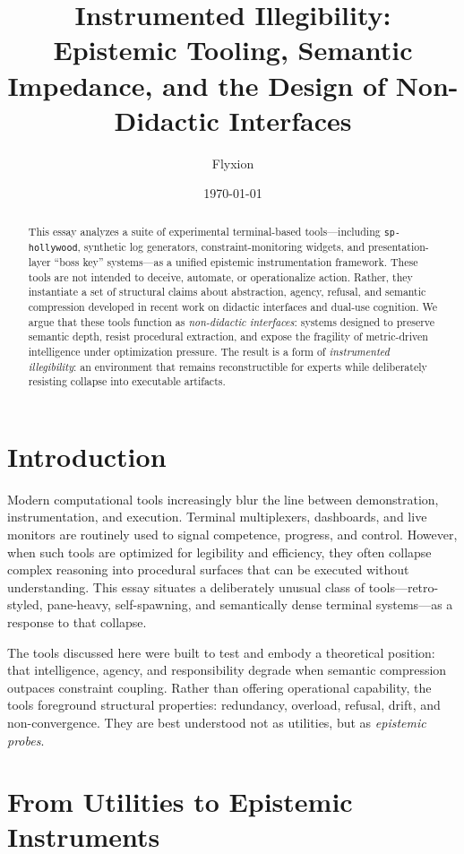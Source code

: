 \documentclass[11pt]{article}
\title{Instrumented Illegibility:\\
Epistemic Tooling, Semantic Impedance, and the Design of Non-Didactic Interfaces}
\author{Flyxion}
\date{\today}
\begin{document}
\maketitle

\begin{abstract}
This essay analyzes a suite of experimental terminal-based tools---including
\texttt{sp-hollywood}, synthetic log generators, constraint-monitoring widgets,
and presentation-layer ``boss key'' systems---as a unified epistemic
instrumentation framework. These tools are not intended to deceive, automate,
or operationalize action. Rather, they instantiate a set of structural claims
about abstraction, agency, refusal, and semantic compression developed in
recent work on didactic interfaces and dual-use cognition. We argue that these
tools function as \emph{non-didactic interfaces}: systems designed to preserve
semantic depth, resist procedural extraction, and expose the fragility of
metric-driven intelligence under optimization pressure. The result is a form
of \emph{instrumented illegibility}: an environment that remains reconstructible
for experts while deliberately resisting collapse into executable artifacts.
\end{abstract}

\section{Introduction}

Modern computational tools increasingly blur the line between demonstration,
instrumentation, and execution. Terminal multiplexers, dashboards, and live
monitors are routinely used to signal competence, progress, and control.
However, when such tools are optimized for legibility and efficiency, they
often collapse complex reasoning into procedural surfaces that can be executed
without understanding. This essay situates a deliberately unusual class of
tools---retro-styled, pane-heavy, self-spawning, and semantically dense terminal
systems---as a response to that collapse.

The tools discussed here were built to test and embody a theoretical position:
that intelligence, agency, and responsibility degrade when semantic compression
outpaces constraint coupling. Rather than offering operational capability, the
tools foreground structural properties: redundancy, overload, refusal, drift,
and non-convergence. They are best understood not as utilities, but as
\emph{epistemic probes}.

\section{From Utilities to Epistemic Instruments}
\end{document}
